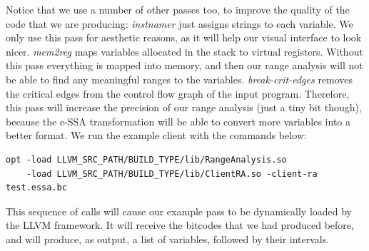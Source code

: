 \documentclass{paper}
\begin{document}
Notice that we use a number of other passes too, to improve the quality of the
code that we are producing:
\textit{instnamer} just assigns strings to each variable.
We only use this pass for aesthetic reasons, as it 
will help our visual interface to look nicer.
\textit{mem2reg} maps variables allocated in the stack to virtual registers.
Without this pass everything is mapped into memory, and then our range analysis
will not be able to find any meaningful ranges to the variables.
\textit{break-crit-edges} removes the critical edges from the control flow graph
of the input program.
Therefore, this pass will increase the precision of our range analysis (just a tiny bit
though), because the e-SSA transformation will be able to convert more variables
into a better format.
We run the example client with the commands below:
\begin{lstlisting}[frame=single]
opt -load LLVM_SRC_PATH/BUILD_TYPE/lib/RangeAnalysis.so 
    -load LLVM_SRC_PATH/BUILD_TYPE/lib/ClientRA.so -client-ra test.essa.bc
\end{lstlisting}

This sequence of calls will cause our example pass to be dynamically loaded
by the LLVM framework.
It will receive the bitcodes that we had produced before, and will produce,
as output, a list of variables, followed by their intervals.





\end{document}
